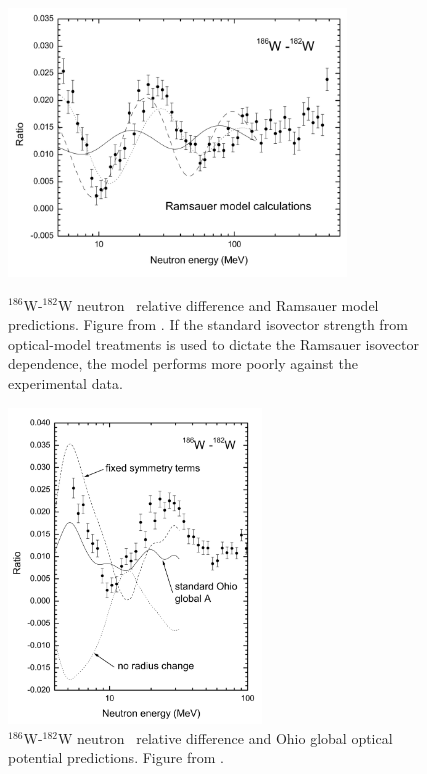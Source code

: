 \begin{figure}[ht!]
    \centering
    \includegraphics[width=0.8\textwidth]{figures/Dietrich2003_RamsauerPotential.png}
    \caption[$^{186}$W-$^{182}$W neutron \tot\ relative difference and
    Ramsauer model predictions]
    {
        $^{186}$W-$^{182}$W neutron \tot\ relative difference and
        Ramsauer model predictions. Figure from \cite{Dietrich2003}.
        If the standard isovector strength from
        optical-model treatments is used to dictate the Ramsauer isovector
        dependence, the model performs more poorly against the experimental
        data.
    }
    \label{Dietrich2003_Ramsauer}

    \vspace*{\floatsep}

    \includegraphics[width=0.6\textwidth]{figures/Dietrich2003_OhioPotential.png}
    \caption[$^{186}$W-$^{182}$W neutron \tot\ relative difference and
    Ohio global optical model predictions]
    {
        $^{186}$W-$^{182}$W neutron \tot\ relative difference and
        Ohio global optical potential predictions. Figure from \cite{Dietrich2003}.
    }
    \label{Dietrich2003_Ohio}
\end{figure}

